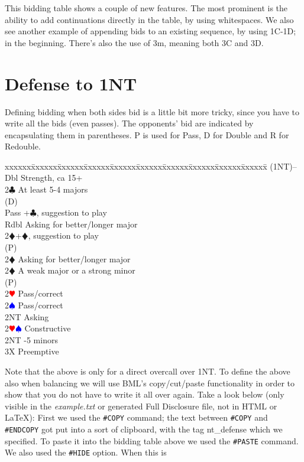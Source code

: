 \documentclass[a4paper]{article}
\newcommand{\BC}{\textcolor{OliveGreen}{$\clubsuit$}}
\newcommand{\BD}{\textcolor{RedOrange}{$\vardiamondsuit$}}
\newcommand{\BH}{\textcolor{Red}{$\varheartsuit${}}}
\newcommand{\BS}{\textcolor{Blue}{$\spadesuit${}}}
\newenvironment{bidtable}
{\begin{tabbing}

xxxxxx\=xxxxxx\=xxxxxx\=xxxxxx\=xxxxxx\=xxxxxx\=xxxxxx\=xxxxxx\=xxxxxx\=xxxxxx\=\kill}
{\end{tabbing} }%
\begin{document}
\bigbreak
This bidding table shows a couple of new features. The most
prominent is the ability to add continuations directly in the
table, by using whitespaces. We also see another example of
appending bids to an existing sequence, by using 1C-1D; in the
beginning. There's also the use of 3m, meaning both 3C and 3D.
\bigbreak
\section{Defense to 1NT}

Defining bidding when both sides bid is a little bit more tricky,
since you have to write all the bids (even passes). The opponents'
bid are indicated by encapsulating them in parentheses. P is used
for Pass, D for Double and R for Redouble.
\bigbreak
\begin{bidtable}
(1NT)--\+\\
Dbl \> Strength, ca 15+\\
2\BC \> At least 5-4 majors\+\\
(D)\+\\
Pass +\BC , suggestion to play\\
Rdbl \> Asking for better/longer major\\
2\BD {}+\BD , suggestion to play\-\\
(P)\+\\
2\BD \> Asking for better/longer major\-\-\\
2\BD \> A weak major or a strong minor\+\\
(P)\+\\
2\BH \> Pass/correct\\
2\BS \> Pass/correct\\
2NT \> Asking\-\-\\
2\BH\BS \> Constructive\\
2NT -5 minors\\
3X \> Preemptive\-
\end{bidtable}
\bigbreak
Note that the above is only for a direct overcall over 1NT. To
define the above also when balancing we will use BML's
copy/cut/paste functionality in order to show that you do not
have to write it all over again. Take a look below (only visible in
the \emph{example.txt} or generated Full Disclosure file, not in HTML or LaTeX):
\bigbreak
First we used the \texttt{\#COPY} command; the text between \texttt{\#COPY} and \texttt{\#ENDCOPY}
got put into a sort of clipboard, with the tag nt\_defense which we
specified. To paste it into the bidding table above we used
the \texttt{\#PASTE} command. We also used the \texttt{\#HIDE} option. When this is
\end{document}
